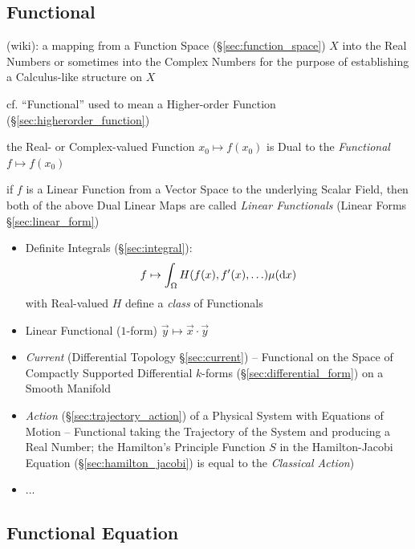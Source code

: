 \subsection{Functional}\label{sec:functional}

(wiki): a mapping from a Function Space (\S\ref{sec:function_space}) $X$ into
the Real Numbers or sometimes into the Complex Numbers for the purpose of
establishing a Calculus-like structure on $X$

\fist cf. ``Functional'' used to mean a Higher-order Function
(\S\ref{sec:higherorder_function})

the Real- or Complex-valued Function $x_0 \mapsto f(x_0)$ is Dual to the
\emph{Functional} $f \mapsto f(x_0)$

if $f$ is a Linear Function from a Vector Space to the underlying Scalar Field,
then both of the above Dual Linear Maps are called \emph{Linear Functionals}
(Linear Forms \S\ref{sec:linear_form})

\begin{itemize}
  \item Definite Integrals (\S\ref{sec:integral}):
    \[
      f \mapsto \int_\Omega H(f(x), f'(x), \ldots) \mu(\mathrm{d}x)
    \]
    with Real-valued $H$ define a \emph{class} of Functionals
  \item Linear Functional ($1$-form) $\vec{y} \mapsto \vec{x} \cdot \vec{y}$
  \item \emph{Current} (Differential Topology \S\ref{sec:current}) -- Functional
    on the Space of Compactly Supported Differential $k$-forms
    (\S\ref{sec:differential_form}) on a Smooth Manifold
  \item \emph{Action} (\S\ref{sec:trajectory_action}) of a Physical System
    with Equations of Motion -- Functional taking the Trajectory of the System
    and producing a Real Number; the Hamilton's Principle Function $S$ in the
    Hamilton-Jacobi Equation (\S\ref{sec:hamilton_jacobi}) is equal to the
    \emph{Classical Action})
  \item ...
\end{itemize}



\subsection{Functional Equation}\label{sec:functional_equation}

